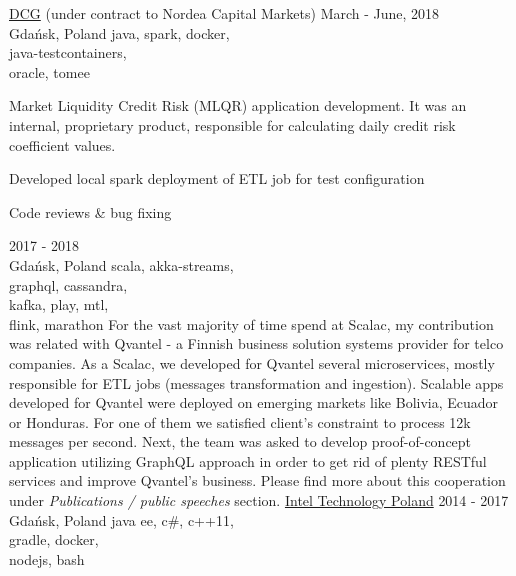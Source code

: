 \documentclass[a4paper,11pt]{cv4tw}%
\begin{document}
      {\href{https://diversecg.pl/}{DCG} (under contract to Nordea Capital Markets)}
      {March - June, 2018\\Gdańsk, Poland}
      {java, spark, docker,\\java-testcontainers,\\oracle, tomee}
      {Market Liquidity Credit Risk (MLQR) application development. It was an internal,
        proprietary product, responsible for calculating daily credit risk
        coefficient values.
        \begin{missions}
        \item Developed local spark deployment of ETL job for test configuration
        \item Code reviews \& bug fixing
        \end{missions}
      }
      {2017 - 2018\\Gdańsk, Poland}
      {scala, akka-streams,\\graphql, cassandra,\\kafka, play, mtl,\\flink, marathon}
      {For the vast majority of time spend at Scalac, my contribution was related with Qvantel - a Finnish business solution systems provider for telco companies.
        As a Scalac, we developed for Qvantel several microservices, mostly responsible for ETL jobs (messages transformation and ingestion).
        Scalable apps developed for Qvantel were deployed on emerging markets like Bolivia, Ecuador or Honduras. For one of them we satisfied client's constraint
        to process \approx12k messages per second. Next, the team was asked to develop proof-of-concept application utilizing GraphQL approach in order to get
        rid of plenty RESTful services and improve Qvantel's business. Please find more about this cooperation under \emph{Publications / public speeches} section.
      }
      {\href{https://www.intel.com/content/www/us/en/jobs/locations/poland.html}
        {Intel Technology Poland}}
      {2014 - 2017\\Gdańsk, Poland}
      {java ee, c\#, c++11,\\gradle, docker,\\nodejs, bash}
\end{document}
